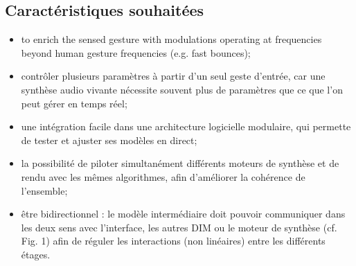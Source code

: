 \subsection{Caractéristiques souhaitées}
\vspace{-1em}
\begin{itemize}[noitemsep]
	\item to enrich the sensed gesture with modulations operating at frequencies beyond human gesture frequencies (e.g. fast bounces);
	\item contrôler plusieurs paramètres à partir d'un seul geste d'entrée, car une synthèse audio vivante nécessite souvent plus de paramètres que ce que l'on peut gérer en temps réel;
	\item une intégration facile dans une architecture logicielle modulaire, qui permette de tester et ajuster ses modèles en direct;
	\item la possibilité de piloter simultanément différents moteurs de synthèse et de rendu avec les mêmes algorithmes, afin d'améliorer la cohérence de l'ensemble;
	\item être bidirectionnel : le modèle intermédiaire doit pouvoir communiquer dans les deux sens avec l'interface, les autres DIM ou le moteur de synthèse (cf. Fig. 1) afin de réguler les interactions (non linéaires) entre les différents étages.
\end{itemize}


